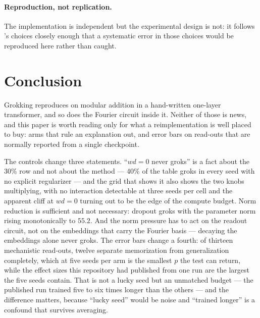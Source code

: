 \documentclass[11pt]{article}
\begin{document}
\paragraph{Reproduction, not replication.} The implementation is independent
but the experimental design is not: it follows \citet{nanda2023progress}'s
choices closely enough that a systematic error in those choices would be
reproduced here rather than caught.

\section{Conclusion}
\label{sec:conclusion}

Grokking reproduces on modular addition in a hand-written one-layer
transformer, and so does the Fourier circuit inside it. Neither of those is
news, and this paper is worth reading only for what a reimplementation is well
placed to buy: arms that rule an explanation out, and error bars on read-outs
that are normally reported from a single checkpoint.

The controls change three statements. ``$wd = 0$ never groks'' is a fact about
the 30\% row and not about the method --- 40\% of the table groks in every
seed with no explicit regularizer --- and the grid that shows it also shows
the two knobs multiplying, with no interaction detectable at three seeds per
cell and the apparent cliff at $wd = 0$ turning out to be the edge of the
compute budget. Norm reduction is sufficient and not necessary: dropout groks
with the parameter norm rising monotonically to $55.2$. And the norm pressure
has to act on the readout circuit, not on the embeddings that carry the
Fourier basis --- decaying the embeddings alone never groks. The error bars
change a fourth: of thirteen mechanistic read-outs, twelve separate
memorization from generalization completely, which at five seeds per arm is
the smallest $p$ the test can return, while the effect sizes this repository
had published from one run are the largest the five seeds contain. That is not
a lucky seed but an unmatched budget --- the published run trained five to six
times longer than the others --- and the difference matters, because ``lucky
seed'' would be noise and ``trained longer'' is a confound that survives
averaging.
\end{document}
